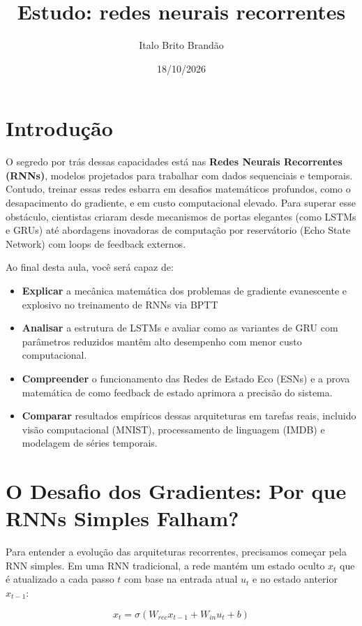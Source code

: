 \documentclass[11pt]{article}
\title{Estudo: redes neurais recorrentes}
\author{Italo Brito Brandão}
\date{18/10/2026}
\begin{document}
\maketitle

\section{Introdução}

O segredo por trás dessas capacidades está nas \textbf{Redes Neurais Recorrentes (RNNs)}, modelos projetados para trabalhar com dados sequenciais e temporais. Contudo, treinar essas redes esbarra em desafios matemáticos profundos, como o desapacimento do gradiente, e em custo computacional elevado.
Para superar esse obstáculo, cientistas criaram desde mecanismos de portas elegantes (como LSTMs e GRUs) até abordagens inovadoras de computação por reservátorio (Echo State Network) com loops de feedback externos.

Ao final desta aula, você será capaz de:

\begin{itemize}
  \item \textbf{Explicar} a mecânica matemática dos problemas de gradiente evanescente e explosivo no treinamento de RNNs via BPTT
  \item \textbf{Analisar} a estrutura de LSTMs e avaliar como as variantes de GRU com parâmetros reduzidos mantêm alto desempenho com menor custo computacional.
  \item \textbf{Compreender} o funcionamento das Redes de Estado Eco (ESNs) e a prova matemática de como feedback de estado aprimora a precisão do sistema.
  \item \textbf{Comparar} resultados empíricos dessas arquiteturas em tarefas reais, incluido visão computacional (MNIST), processamento de linguagem (IMDB) e modelagem de séries temporais.
\end{itemize}

\section{O Desafio dos Gradientes: Por que RNNs Simples Falham?}

Para entender a evolução das arquiteturas recorrentes, precisamos começar pela RNN simples. Em uma RNN tradicional, a rede mantém um estado oculto \(x_t\) que é atualizado a cada passo \(t\) com base na entrada atual \(u_t\) e no estado anterior \(x_{t-1}\):

\begin{equation}
  x_t = \sigma(W_{rec} x_{t-1} + W_{in} u_t + b)
\end{equation}
\end{document}
